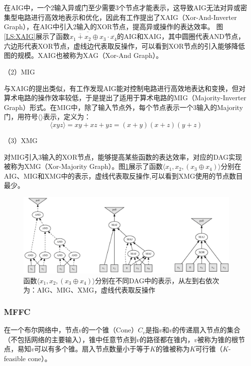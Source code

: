 在AIG中，一个2输入异或门至少需要3个节点才能表示，这导致AIG无法对异或密集型电路进行高效地表示和优化，因此有工作提出了XAIG（Xor-And-Inverter Graph），在AIG中引入2输入的XOR节点，提高异或操作的表达效率\cite{LS:XAIG_Microelec_Relia,LS:XAIG_ddecs,LS:XAIG_iwls}。
图\ref{LS:XAIG}展示了函数$ \overline{ \overline{x_1 + x_2} \oplus x_3} \cdot \overline{x_4} $的AIG和XAIG，其中圆圈代表AND节点，六边形代表XOR节点，虚线边代表取反操作，可以看到XOR节点的引入能够降低图的规模。XAIG也被称为XAG（Xor-And Graph）。

（2）MIG

与XAIG的提出类似，有工作发现AIG能对控制电路进行高效地表达和变换，但对算术电路的操作效率较低，于是提出了适用于算术电路的MIG（Majority-Inverter Graph）\cite{LS:MIG}形式。在MIG中，除了输入节点外，每个节点表示一个3输入的Majority门，用符号$\langle \rangle$表示，定义为：
\begin{equation}
    \label{LS:MIG:Eq:Majority}
    \langle xyz \rangle = xy + xz + yz = (x + y) (x + z) (y + z)
\end{equation}

（3）XMG

对MIG引入3输入的XOR节点，能够提高某些函数的表达效率，对应的DAG实现被称为XMG（Xor-Majority Graph）\cite{LS:XMG_2017}。图\ref{LS:XMG}展示了函数$\langle x_1,x_2,(x_3 \oplus x_4) \rangle$分别在AIG、MIG和XMG中的表示，虚线代表取反操作,可以看到XMG使用的节点数目最少\cite{LS:XMG_2024}。

\begin{figure}[!htbp]
    \centering
    \includegraphics[width=\linewidth]{./figs/LS-XMG.png}
    \caption{函数$\langle x_1,x_2,(x_3 \oplus x_4) \rangle$分别在不同DAG中的表示，从左到右依次为：AIG、MIG、XMG，虚线代表取反操作}
    \label{LS:XMG}
\end{figure}

\subsubsection{MFFC} \label{MFFC}

在一个布尔网络中，节点$v$的一个锥（Cone）$C_v$是指$v$和$v$的传递扇入节点的集合（不包括网络的主要输入），锥中任意节点到$v$的路径都在锥内，$v$被称为锥的根节点，易知$v$可以有多个锥\cite{LS:exact_rewriting,FPGA:Jason_Cong_1993}。扇入节点数量小于等于$K$的锥被称为$K$可行锥（$K$-feasible cone）\cite{FPGA:Jason_Cong_1999_cut_ranking}。

